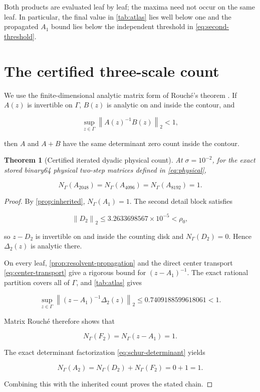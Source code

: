\documentclass[11pt]{article}
\newtheorem{theorem}{Theorem}[section]
\theoremstyle{definition}
\theoremstyle{remark}
\newcommand{\norm}[1]{\left\lVert #1\right\rVert}
\begin{document}
Both products are evaluated leaf by leaf; the maxima need not occur on the
same leaf.  In particular, the final value in \cref{tab:atlas} lies well below
one and the propagated $A_1$ bound lies below the independent threshold in
\eqref{eq:second-threshold}.

\section{The certified three-scale count}
\label{sec:theorem}

We use the finite-dimensional analytic matrix form of Rouch\'e's theorem
\citep{Ahlfors1979,GohbergSigal1971}.  If $A(z)$ is invertible on
\(\Gamma\), $B(z)$ is analytic on and inside the contour, and

\[
\sup_{z\in\Gamma}\norm{A(z)^{-1}B(z)}_2<1,
\]

then $A$ and $A+B$ have the same determinant zero count inside the
contour.

\begin{theorem}[Certified iterated dyadic physical count]
\label{thm:main}
At \(\sigma=10^{-2}\), for the exact stored binary64 physical two-step
matrices defined in \eqref{eq:physical},

\[
\boxed{N_{\Gamma}(A_{2048})=N_{\Gamma}(A_{4096})
=N_{\Gamma}(A_{8192})=1.}
\]
\end{theorem}

\begin{proof}
By \cref{prop:inherited}, $N_{\Gamma}(A_1)=1$.  The second detail block
satisfies

\[
\norm{D_2}_2\le3.2633698567\times10^{-5}<\rho_0,
\]

so $z-D_2$ is invertible on and inside the counting disk and
$N_{\Gamma}(D_2)=0$.  Hence \(\Delta_2(z)\) is analytic there.

On every leaf, \cref{prop:resolvent-propagation} and the direct center
transport \eqref{eq:center-transport} give a rigorous bound for
$(z-A_1)^{-1}$.  The exact rational partition covers all of \(\Gamma\), and
\cref{tab:atlas} gives

\[
\sup_{z\in\Gamma}
\norm{(z-A_1)^{-1}\Delta_2(z)}_2
\le0.7409188599618061<1.
\]

Matrix Rouch\'e therefore shows that

\[
N_{\Gamma}(F_2)=N_{\Gamma}(z-A_1)=1.
\]

The exact determinant factorization \eqref{eq:schur-determinant} yields

\[
N_{\Gamma}(A_2)=N_{\Gamma}(D_2)+N_{\Gamma}(F_2)=0+1=1.
\]

Combining this with the inherited count proves the stated chain.
\end{proof}
\end{document}
